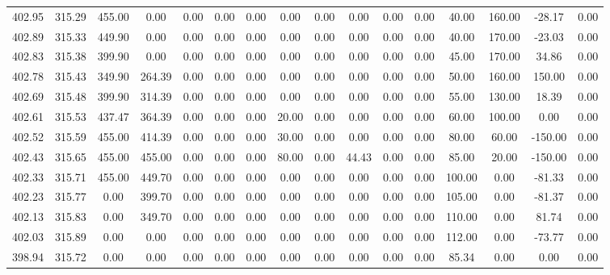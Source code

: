\begin{table}[!ht]
{\begin{tabular}{cccccccccccccccc}
402.95 & 315.29 & 455.00 & 0.00 & 0.00 & 0.00 & 0.00 & 0.00 & 0.00 & 0.00 & 0.00 & 0.00 & 40.00 & 160.00 & -28.17 & 0.00 \\
402.89 & 315.33 & 449.90 & 0.00 & 0.00 & 0.00 & 0.00 & 0.00 & 0.00 & 0.00 & 0.00 & 0.00 & 40.00 & 170.00 & -23.03 & 0.00 \\
402.83 & 315.38 & 399.90 & 0.00 & 0.00 & 0.00 & 0.00 & 0.00 & 0.00 & 0.00 & 0.00 & 0.00 & 45.00 & 170.00 & 34.86 & 0.00 \\
402.78 & 315.43 & 349.90 & 264.39 & 0.00 & 0.00 & 0.00 & 0.00 & 0.00 & 0.00 & 0.00 & 0.00 & 50.00 & 160.00 & 150.00 & 0.00 \\
402.69 & 315.48 & 399.90 & 314.39 & 0.00 & 0.00 & 0.00 & 0.00 & 0.00 & 0.00 & 0.00 & 0.00 & 55.00 & 130.00 & 18.39 & 0.00 \\
402.61 & 315.53 & 437.47 & 364.39 & 0.00 & 0.00 & 0.00 & 20.00 & 0.00 & 0.00 & 0.00 & 0.00 & 60.00 & 100.00 & 0.00 & 0.00 \\
402.52 & 315.59 & 455.00 & 414.39 & 0.00 & 0.00 & 0.00 & 30.00 & 0.00 & 0.00 & 0.00 & 0.00 & 80.00 & 60.00 & -150.00 & 0.00 \\
402.43 & 315.65 & 455.00 & 455.00 & 0.00 & 0.00 & 0.00 & 80.00 & 0.00 & 44.43 & 0.00 & 0.00 & 85.00 & 20.00 & -150.00 & 0.00 \\
402.33 & 315.71 & 455.00 & 449.70 & 0.00 & 0.00 & 0.00 & 0.00 & 0.00 & 0.00 & 0.00 & 0.00 & 100.00 & 0.00 & -81.33 & 0.00 \\
402.23 & 315.77 & 0.00 & 399.70 & 0.00 & 0.00 & 0.00 & 0.00 & 0.00 & 0.00 & 0.00 & 0.00 & 105.00 & 0.00 & -81.37 & 0.00 \\
402.13 & 315.83 & 0.00 & 349.70 & 0.00 & 0.00 & 0.00 & 0.00 & 0.00 & 0.00 & 0.00 & 0.00 & 110.00 & 0.00 & 81.74 & 0.00 \\
402.03 & 315.89 & 0.00 & 0.00 & 0.00 & 0.00 & 0.00 & 0.00 & 0.00 & 0.00 & 0.00 & 0.00 & 112.00 & 0.00 & -73.77 & 0.00 \\
398.94 & 315.72 & 0.00 & 0.00 & 0.00 & 0.00 & 0.00 & 0.00 & 0.00 & 0.00 & 0.00 & 0.00 & 85.34 & 0.00 & 0.00 & 0.00 \\
\bottomrule
\end{tabular}
}
\end{table}